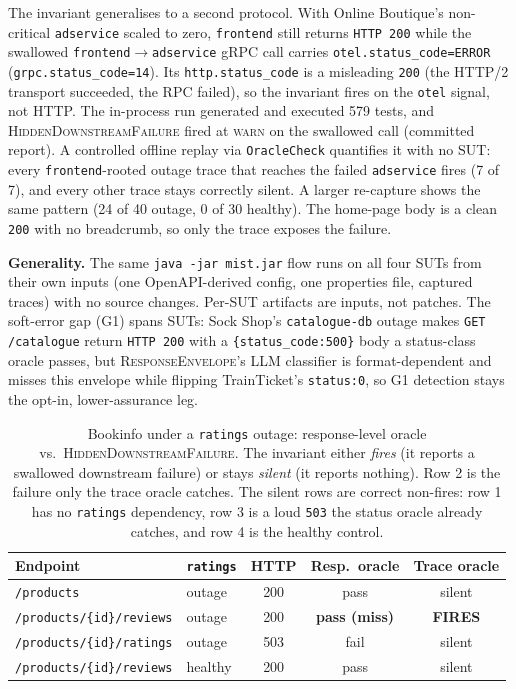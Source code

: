 \documentclass[sigconf,screen,review]{acmart}
\begin{document}
The invariant generalises to a second protocol. With Online Boutique's non-critical \texttt{adservice} scaled to zero, \texttt{frontend} still returns \texttt{HTTP 200} while the swallowed \texttt{frontend}$\to$\texttt{adservice} gRPC call carries \texttt{otel.status\_code=ERROR} (\texttt{grpc.status\_code=14}). Its \texttt{http.status\_code} is a misleading \texttt{200} (the HTTP/2 transport succeeded, the RPC failed), so the invariant fires on the \texttt{otel} signal, not HTTP. The in-process run generated and executed 579 tests, and \textsc{HiddenDownstreamFailure} fired at \textsc{warn} on the swallowed call (committed report). A controlled offline replay via \texttt{OracleCheck} quantifies it with no SUT: every \texttt{frontend}-rooted outage trace that reaches the failed \texttt{adservice} fires (7 of 7), and every other trace stays correctly silent. A larger re-capture shows the same pattern (24 of 40 outage, 0 of 30 healthy). The home-page body is a clean \texttt{200} with no breadcrumb, so only the trace exposes the failure.

\textbf{Generality.} The same \texttt{java -jar mist.jar} flow runs on all four SUTs from their own inputs (one OpenAPI-derived config, one properties file, captured traces) with no source changes. Per-SUT artifacts are inputs, not patches. The soft-error gap (G1) spans SUTs: Sock Shop's \texttt{catalogue-db} outage makes \texttt{GET /catalogue} return \texttt{HTTP 200} with a \texttt{\{status\_code:500\}} body a status-class oracle passes, but \textsc{ResponseEnvelope}'s LLM classifier is format-dependent and misses this envelope while flipping TrainTicket's \texttt{status:0}, so G1 detection stays the opt-in, lower-assurance leg.

\begin{table}[t]
\centering
\caption{Bookinfo under a \texttt{ratings} outage: response-level oracle vs.\ \textsc{HiddenDownstreamFailure}. The invariant either \emph{fires} (it reports a swallowed downstream failure) or stays \emph{silent} (it reports nothing). Row 2 is the failure only the trace oracle catches. The silent rows are correct non-fires: row 1 has no \texttt{ratings} dependency, row 3 is a loud \texttt{503} the status oracle already catches, and row 4 is the healthy control.}
\label{tab:bookinfo}
\footnotesize
\begin{tabular}{@{}llccc@{}}
\toprule
\textbf{Endpoint} & \texttt{ratings} & \textbf{HTTP} & \textbf{Resp.\ oracle} & \textbf{Trace oracle} \\
\midrule
\texttt{/products}                & outage  & 200 & pass            & silent  \\
\texttt{/products/\{id\}/reviews} & outage  & 200 & \textbf{pass (miss)} & \textbf{FIRES}    \\
\texttt{/products/\{id\}/ratings} & outage  & 503 & fail            & silent  \\
\texttt{/products/\{id\}/reviews} & healthy & 200 & pass            & silent  \\
\bottomrule
\end{tabular}
\end{table}
\end{document}
